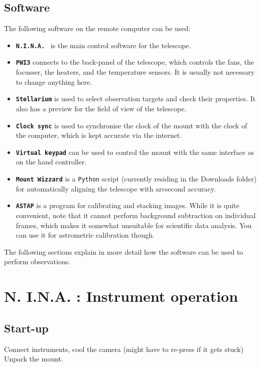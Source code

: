 \documentclass[a4paper, 11pt, fleqn]{memoir}
\begin{document}
\subsection{Software}
The following software on the remote computer can be used:
\begin{itemize}
    \item \textbf{\texttt{N.I.N.A.
              }} is the main control software for the telescope.
    \item
          \textbf{\texttt{PWI3}} connects to the back-panel of the telescope, which controls the fans, the focusser, the heaters, and the temperature sensors.
          It is usually not necessary to change anything here.
    \item
          \textbf{\texttt{Stellarium}} is used to select observation targets and check their properties.
          It also has a preview for the field of view of the telescope.
    \item
          \textbf{\texttt{Clock sync}} is used to synchronise the clock of the mount with the clock of the computer, which is kept accurate via the internet.
    \item
          \textbf{\texttt{Virtual keypad}} can be used to control the mount with the same interface as on the hand controller.
    \item
          \textbf{\texttt{Mount Wizzard}} is a \texttt{Python} script (currently residing in the Downloads folder) for automatically aligning the telescope with arcsecond accuracy.
    \item
          \textbf{\texttt{ASTAP}} is a program for calibrating and stacking images.
          While it is quite convenient, note that it cannot perform background subtraction on individual frames, which makes it somewhat unsuitable for scientific data analysis.
          You can use it for astrometric calibration though.
\end{itemize}
The following sections explain in more detail how the software can be used to perform observations.

\section{N.
  I.N.A.
  : Instrument operation}

\subsection{Start-up}
Connect instruments, cool the camera (might have to re-press if it gets stuck) Unpark the mount.
\end{document}
